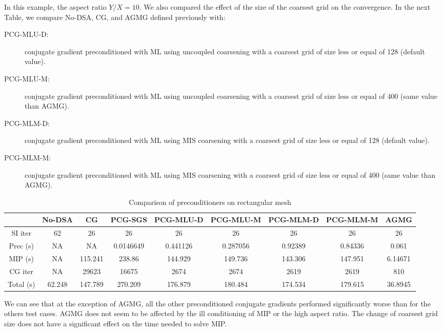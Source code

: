 In this example, the aspect ratio $Y/X = 10$. We
also compared the effect of the size of the coarsest grid on the convergence.
In the next Table, we compare No-DSA, CG, and AGMG defined previously with:
\begin{description}
  \item[PCG-MLU-D:] conjugate gradient preconditioned with ML
    using uncoupled coarsening with a coarsest grid of size less 
    or equal of 128 (default value).
  \item[PCG-MLU-M:] conjugate gradient preconditioned with ML
    using uncoupled coarsening with a coarsest grid of size less 
    or equal of 400 (same value than AGMG).
  \item[PCG-MLM-D:] conjugate gradient preconditioned with ML
    using MIS coarsening with a coarsest grid of size less or 
    equal of 128 (default value).
  \item[PCG-MLM-M:] conjugate gradient preconditioned with ML
    using MIS coarsening with a coarsest grid of size less or 
    equal of 400 (same value than AGMG).
\end{description}
\begin{landscape}
  \begin{center}
    \begin{table}[H]
      \caption{Comparison of preconditioners on rectangular mesh}
      \begin{centering}
        \begin{tabular}{|c|c|c|c|c|c|c|c|c|}
          \hline
          & No-DSA & CG & PCG-SGS & PCG-MLU-D & PCG-MLU-M & PCG-MLM-D &
          PCG-MLM-M & AGMG \\
          \hline
          SI iter    & 62     & 26      & 26        & 26       & 26       & 26      
                     & 26     & 26 \\
          Prec (s)   & NA     & NA      & 0.0146649 & 0.441126 & 0.287056 & 0.92389 
                     & 0.84336 & 0.061 \\
          MIP (s)    & NA     & 115.241 & 238.86    & 144.929  & 149.736  & 143.306 
                     & 147.951 & 6.14671 \\
          CG iter    & NA     & 29623   & 16675     & 2674     & 2674     & 2619    
                     & 2619   & 810 \\
          Total (s)  & 62.248 & 147.789 & 270.209   & 176.879  & 180.484  & 174.534 
                     & 179.615 & 36.8945 \\
          \hline
        \end{tabular}
      \end{centering}
    \end{table}
  \end{center}
\end{landscape}
We can see that at the exception of AGMG, all the other preconditioned 
conjugate gradients performed significantly worse than for the others test 
cases. AGMG does not seem to be affected by the ill conditioning of MIP or the 
high aspect ratio. The change of coarsest grid size does not have a significant 
effect on the time needed to solve MIP.
